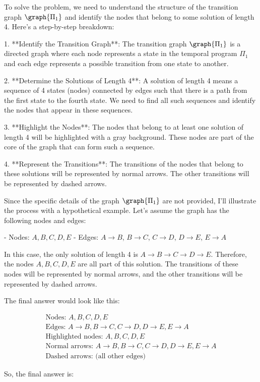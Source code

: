 To solve the problem, we need to understand the structure of the transition graph \(\graph{\Pi_1}\) and identify the nodes that belong to some solution of length 4. Here's a step-by-step breakdown:

1. **Identify the Transition Graph**: The transition graph \(\graph{\Pi_1}\) is a directed graph where each node represents a state in the temporal program \(\Pi_1\) and each edge represents a possible transition from one state to another.

2. **Determine the Solutions of Length 4**: A solution of length 4 means a sequence of 4 states (nodes) connected by edges such that there is a path from the first state to the fourth state. We need to find all such sequences and identify the nodes that appear in these sequences.

3. **Highlight the Nodes**: The nodes that belong to at least one solution of length 4 will be highlighted with a gray background. These nodes are part of the core of the graph that can form such a sequence.

4. **Represent the Transitions**: The transitions of the nodes that belong to these solutions will be represented by normal arrows. The other transitions will be represented by dashed arrows.

Since the specific details of the graph \(\graph{\Pi_1}\) are not provided, I'll illustrate the process with a hypothetical example. Let's assume the graph has the following nodes and edges:

- Nodes: \(A, B, C, D, E\)
- Edges: \(A \to B\), \(B \to C\), \(C \to D\), \(D \to E\), \(E \to A\)

In this case, the only solution of length 4 is \(A \to B \to C \to D \to E\). Therefore, the nodes \(A, B, C, D, E\) are all part of this solution. The transitions of these nodes will be represented by normal arrows, and the other transitions will be represented by dashed arrows.

The final answer would look like this:

\[
\begin{array}{c}
\text{Nodes: } A, B, C, D, E \\
\text{Edges: } A \to B, B \to C, C \to D, D \to E, E \to A \\
\text{Highlighted nodes: } A, B, C, D, E \\
\text{Normal arrows: } A \to B, B \to C, C \to D, D \to E, E \to A \\
\text{Dashed arrows: } \text{(all other edges)}
\end{array}
\]

So, the final answer is:

